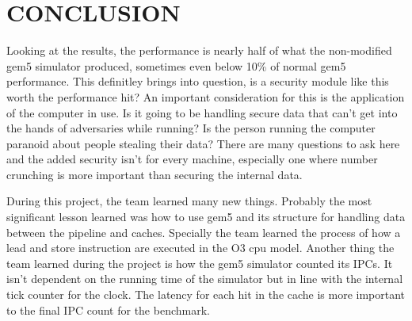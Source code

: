 \documentclass[letterpaper, 10 pt, conference]{ieeeconf}  %
\begin{document}
\section{CONCLUSION}

Looking at the results, the performance is nearly half of what the non-modified gem5 simulator produced, sometimes even below 10\% of normal gem5 performance. This definitley brings into question, is a security module like this worth the performance hit? An important consideration for this is the application of the computer in use. Is it going to be handling secure data that can't get into the hands of adversaries while running? Is the person running the computer paranoid about people
stealing their data? There are many questions to ask here and the added security isn't for every machine, especially one where number crunching is more important than securing the internal data.

During this project, the team learned many new things. Probably the most significant lesson learned was how to use gem5 and its structure for handling data between the pipeline and caches. Specially the team learned the process of how a lead and store instruction are executed in the O3 cpu model. Another thing the team learned during the project is how the gem5 simulator counted its IPCs. It isn't dependent on the running time of the simulator but in line with the internal tick counter for
the clock. The latency for each hit in the cache is more important to the final IPC count for the benchmark.

\addtolength{\textheight}{-12cm}   %







\end{document}
